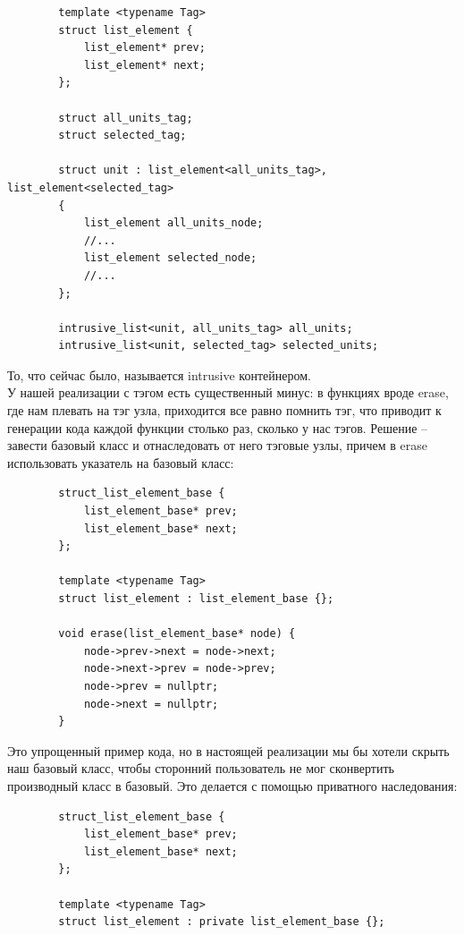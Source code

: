 \documentclass[12pt, a4paper]{article}
\begin{document}
	\begin{verbatim}
		template <typename Tag>
		struct list_element {
			list_element* prev;
			list_element* next;
		};
		
		struct all_units_tag;
		struct selected_tag;
		
		struct unit : list_element<all_units_tag>, list_element<selected_tag>
		{
			list_element all_units_node;
			//...
			list_element selected_node;
			//...
		};
		
		intrusive_list<unit, all_units_tag> all_units;
		intrusive_list<unit, selected_tag> selected_units;
	\end{verbatim}
	То, что сейчас было, называется intrusive контейнером.\\
	У нашей реализации с тэгом есть существенный минус: в функциях вроде erase, где нам плевать на тэг узла, приходится все равно помнить тэг, что приводит к генерации кода каждой функции столько раз, сколько у нас тэгов. Решение -- завести базовый класс и отнаследовать от него тэговые узлы, причем в erase использовать указатель на базовый класс:
	\begin{verbatim}
		struct_list_element_base {
			list_element_base* prev;
			list_element_base* next;
		};
		
		template <typename Tag>
		struct list_element : list_element_base {};
		
		void erase(list_element_base* node) {
			node->prev->next = node->next;
			node->next->prev = node->prev;
			node->prev = nullptr;
			node->next = nullptr;
		}
	\end{verbatim}
	Это упрощенный пример кода, но в настоящей реализации мы бы хотели скрыть наш базовый класс, чтобы сторонний пользователь не мог сконвертить производный класс в базовый. Это делается с помощью приватного наследования:
	\begin{verbatim}
		struct_list_element_base {
			list_element_base* prev;
			list_element_base* next;
		};
		
		template <typename Tag>
		struct list_element : private list_element_base {};
	\end{verbatim}
\end{document}
